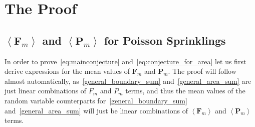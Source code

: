 \documentclass[12pt]{article}
\newcommand{\F}[1]{F_{#1}}
\renewcommand{\P}[1]{P_{#1}}
\newcommand{\BF}[1]{\mathbf{F}_{#1}}
\newcommand{\BP}[1]{\mathbf{P}_{#1}}
\begin{document}

\section{The Proof}

\subsection{$\left\langle \BF{m}\right\rangle$ and $\left\langle \BP{m}\right\rangle$ for Poisson Sprinklings}

In order to prove~\eqref{eq:mainconjecture} and~\eqref{eq:conjecture_for_area} let us first derive expressions for the mean values of $\BF{m}$ and $\BP{m}$. The proof will follow almost automatically, as~\eqref{general_boundary_sum} and~\eqref{general_area_sum} are just linear combinations of $\F{m}$ and $\P{m}$ terms, and thus the mean values of the random variable counterparts for~\eqref{general_boundary_sum} and~\eqref{general_area_sum} will just be linear combinations of $\left\langle \BF{m}\right\rangle$ and $\left\langle \BP{m}\right\rangle$ terms.
\end{document}
